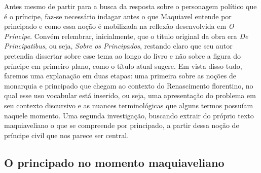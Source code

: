 Antes mesmo de partir para a busca da resposta sobre o personagem
político que é o príncipe, faz-se necessário indagar antes o que
Maquiavel entende por principado e como essa noção é mobilizada na
reflexão desenvolvida em \emph{O Príncipe}. Convém relembrar,
inicialmente, que o título original da obra era \emph{De Principatibus},
ou seja, \emph{Sobre os Principados}, restando claro que seu autor
pretendia dissertar sobre esse tema ao longo do livro e não sobre a
figura do príncipe em primeiro plano, como o título atual sugere. Em
vista disso tudo, faremos uma explanação em duas etapas: uma primeira
sobre as noções de monarquia e principado que chegam ao contexto do
Renascimento florentino, no qual esse uso vocabular está inserido, ou
seja, uma apresentação do problema em seu contexto discursivo e as
nuances terminológicas que alguns termos possuíam naquele momento. Uma
segunda investigação, buscando extrair do próprio texto maquiaveliano o
que se compreende por principado, a partir dessa noção de príncipe civil
que nos parece ser central.

\subsection{O principado no momento maquiaveliano}

